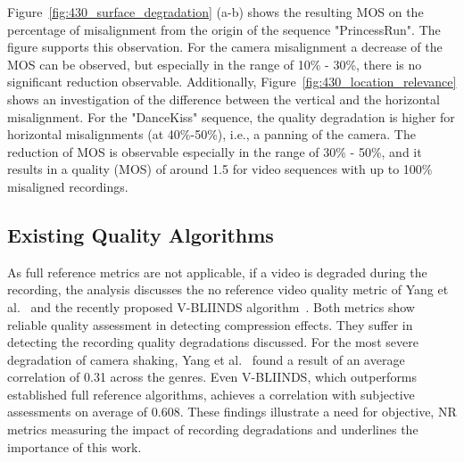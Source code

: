 Figure~\ref{fig:430_surface_degradation} (a-b) shows the resulting \ac{MOS} on the percentage of misalignment from the origin of the sequence "PrincessRun".
The figure supports this observation.
For the camera misalignment a decrease of the \ac{MOS} can be observed, but especially in the range of 10\% - 30\%, there is no significant reduction observable.
Additionally, Figure~\ref{fig:430_location_relevance} shows an investigation of the difference between the vertical and the horizontal misalignment.  
For the "DanceKiss" sequence, the quality degradation is higher for horizontal misalignments (at 40\%-50\%), i.e., a panning of the camera. 
The reduction of \ac{MOS} is observable especially in the range of 30\% - 50\%, and it results in a quality (\ac{MOS}) of around 1.5 for video sequences with up to 100\% misaligned recordings. 
\subsection{Existing Quality Algorithms}
As full reference metrics are not applicable, if a video is degraded during the recording, the analysis discusses the no reference video quality metric of Yang et al.~\cite{Yang2005} and the recently proposed \ac{V-BLIINDS} algorithm~\cite{Saad2014}.
Both metrics show reliable quality assessment in detecting compression effects.
They suffer in detecting the recording quality degradations discussed.
For the most severe degradation of camera shaking, Yang et al.~\cite{Yang2005} found a result of an average correlation of 0.31 across the genres.
Even \ac{V-BLIINDS}, which outperforms established full reference algorithms, achieves a correlation with subjective assessments on average of 0.608.
These findings illustrate a need for objective, \ac{NR} metrics measuring the impact of recording degradations and underlines the importance of this work.